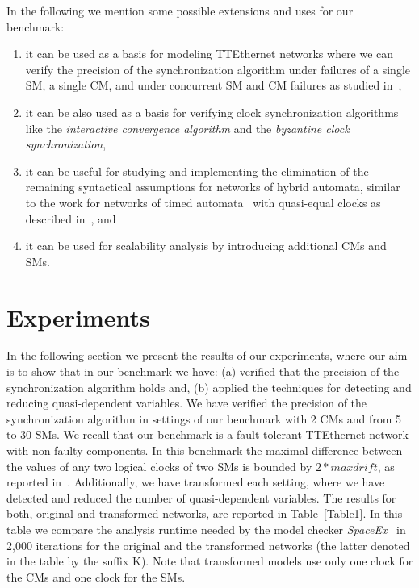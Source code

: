 In the following we mention some possible extensions and uses for our benchmark:
\begin{enumerate} 
\item it can be used as a basis for modeling TTEthernet networks where we can verify the
precision of the synchronization algorithm under failures of a single SM, a single CM, and
under concurrent SM and CM failures as studied in~\cite{Steiner2},   
\item it can be also used as a basis for verifying 
clock synchronization algorithms like the \emph{interactive convergence algorithm}\cite{lamport}
and the \emph{byzantine clock synchronization}\cite{lamport},
\item it can be useful for studying
and implementing the elimination of the remaining syntactical assumptions for
networks of hybrid automata, similar to the work for networks of timed automata~\cite{Alur} 
with quasi-equal clocks as described in~\cite{Herrera4}, and
\item  it can be used for scalability analysis 
by introducing additional CMs and SMs.
\end{enumerate} 
 
\section{Experiments}
In the following section we present the results of our experiments, where our aim is to show that
in our benchmark we have: (a) verified that the precision of the synchronization algorithm holds and, 
(b) applied the techniques for detecting and reducing quasi-dependent variables. 
We have verified the precision of the synchronization algorithm in settings of our benchmark with 2 CMs and from 5 to 30 SMs. 
We recall that our benchmark is a fault-tolerant TTEthernet network with non-faulty components. 
In this benchmark the maximal difference between the values of any two logical clocks of two SMs is bounded by 
$2*\mathit{maxdrift}$, as reported in~\cite{Steiner2}.
Additionally, we have transformed each setting, where we have detected and reduced the number of 
quasi-dependent variables. The results for both, original and transformed networks, are reported in 
Table~\ref{Table1}. In this table we compare the analysis runtime needed by the model checker 
\emph{SpaceEx}~\cite{Frehse,bogomolov-et-al-sttt2015,DBLP:conf/hvc/BogomolovFGGPPS14} in 2,000 iterations
 for the original and the transformed networks (the latter denoted in the table by the suffix K). 
Note that transformed models use only one clock for the CMs and one clock for the SMs. 

